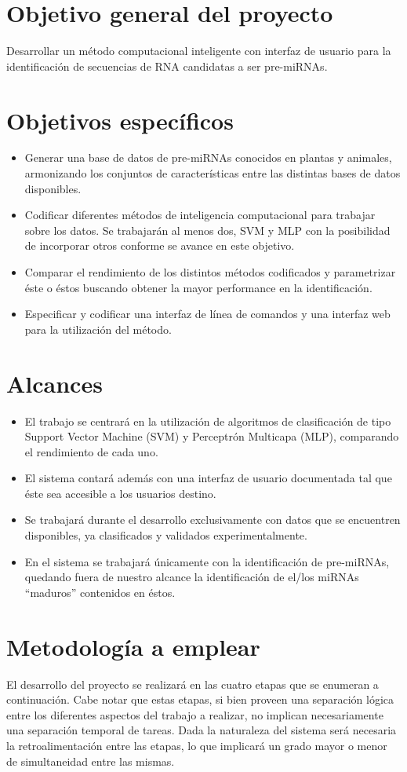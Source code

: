 \documentclass[bibliography=openstyle,DIV=12]{scrartcl}
\begin{document}
\section{Objetivo general del proyecto}
Desarrollar un método computacional inteligente con interfaz de usuario para la identificación de secuencias de RNA candidatas a ser pre-miRNAs.
\section{Objetivos específicos}
\begin{itemize}
\item Generar una base de datos de pre-miRNAs conocidos en plantas y animales, armonizando los conjuntos de características entre las distintas bases de datos disponibles.
\item Codificar diferentes métodos de inteligencia computacional para trabajar sobre los datos. Se trabajarán al menos dos, SVM y MLP con la posibilidad de incorporar otros conforme se avance en este objetivo.
\item Comparar el rendimiento de los distintos métodos codificados y parametrizar éste o éstos buscando obtener la mayor performance en la identificación.
\item Especificar y codificar una interfaz de línea de comandos y una interfaz web para la utilización del método.
\end{itemize}
\section{Alcances}
\begin{itemize}
\item El trabajo se centrará en la utilización de algoritmos de clasificación de tipo Support Vector Machine (SVM) y Perceptrón Multicapa (MLP), comparando el rendimiento de cada uno.
\item El sistema contará además con una interfaz de usuario documentada tal que éste sea accesible a los usuarios destino.
\item Se trabajará durante el desarrollo exclusivamente con datos que se encuentren disponibles, ya clasificados y validados experimentalmente.
\item En el sistema se trabajará únicamente con la identificación de pre-miRNAs, quedando fuera de nuestro alcance la identificación de el/los miRNAs “maduros” contenidos en éstos.
\end{itemize}

\section{Metodología a emplear}
El desarrollo del proyecto se realizará en las cuatro etapas que se enumeran a continuación. Cabe notar que estas etapas, si bien proveen una separación lógica entre los diferentes aspectos del trabajo a realizar, no implican necesariamente una separación temporal de tareas. Dada la naturaleza del sistema será necesaria la retroalimentación entre las etapas, lo que implicará un grado mayor o menor de simultaneidad entre las mismas.
\end{document}
